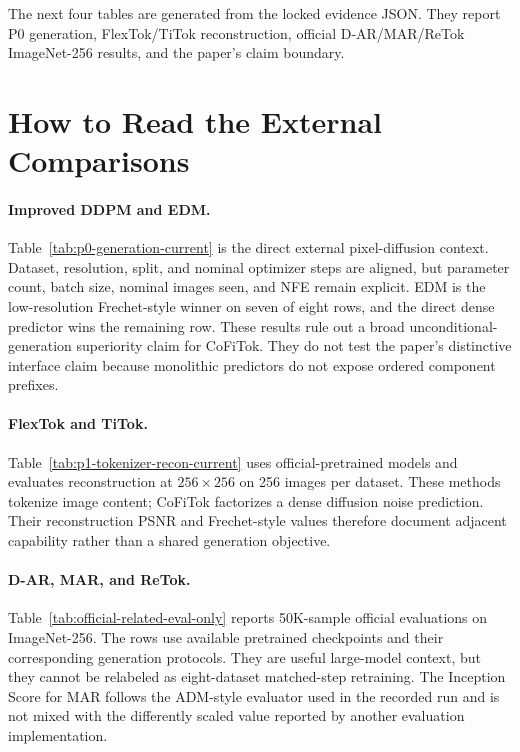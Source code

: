 \documentclass[letterpaper]{article}
\newcommand{\method}{CoFiTok}
\begin{document}
The next four tables are generated from the locked evidence JSON. They report
P0 generation, FlexTok/TiTok reconstruction, official D-AR/MAR/ReTok
ImageNet-256 results, and the paper's claim boundary.

\newpage

\section{How to Read the External Comparisons}

\paragraph{Improved DDPM and EDM.}
Table~\ref{tab:p0-generation-current} is the direct external pixel-diffusion
context. Dataset, resolution, split, and nominal optimizer steps are aligned,
but parameter count, batch size, nominal images seen, and NFE remain explicit.
EDM is the low-resolution Frechet-style winner on seven of eight rows, and the
direct dense predictor wins the remaining row. These results rule out a broad
unconditional-generation superiority claim for \method. They do not test the
paper's distinctive interface claim because monolithic predictors do not expose
ordered component prefixes.

\paragraph{FlexTok and TiTok.}
Table~\ref{tab:p1-tokenizer-recon-current} uses official-pretrained models and
evaluates reconstruction at $256\times256$ on 256 images per dataset. These
methods tokenize image content; \method{} factorizes a dense diffusion noise
prediction. Their reconstruction PSNR and Frechet-style values therefore
document adjacent capability rather than a shared generation objective.



\paragraph{D-AR, MAR, and ReTok.}
Table~\ref{tab:official-related-eval-only} reports 50K-sample official
evaluations on ImageNet-256. The rows use available pretrained checkpoints and
their corresponding generation protocols. They are useful large-model context,
but they cannot be relabeled as eight-dataset matched-step retraining. The
Inception Score for MAR follows the ADM-style evaluator used in the recorded
run and is not mixed with the differently scaled value reported by another
evaluation implementation.
\end{document}
